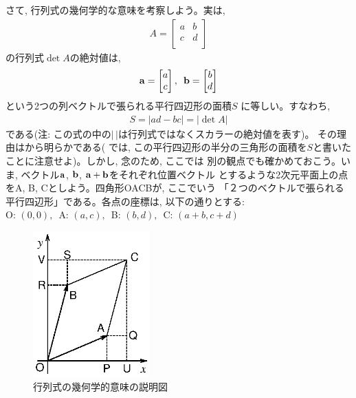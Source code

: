 さて, 行列式の幾何学的な意味を考察しよう。実は, 
\begin{eqnarray} A=\begin{bmatrix}
a & b \\
c & d \\
\end{bmatrix}\end{eqnarray}
の行列式$\det A$の絶対値は, 
\begin{eqnarray} 
\bf a=\begin{bmatrix}
a\\
c\\
\end{bmatrix},\,\,\,
\bf b=\begin{bmatrix}
b\\
d\\
\end{bmatrix}
\end{eqnarray}
という2つの列ベクトルで張られる平行四辺形の面積$S$
に等しい。すなわち, 
\begin{eqnarray}
S=|ad-bc|=|\det A|
\end{eqnarray}
である(注: この式の中の$|\,|$は行列式ではなくスカラーの絶対値を表す)。
その理由はから明らかである(
では, この平行四辺形の半分の三角形の面積を$S$と書いたことに注意せよ)。しかし, 念のため, ここでは
別の観点でも確かめておこう。いま, ベクトル${\bf a}$, ${\bf b}$, ${\bf a} + {\bf b}$をそれぞれ位置ベクトル
とするような2次元平面上の点をA, B, Cとしよう。四角形OACBが, ここでいう
「２つのベクトルで張られる平行四辺形」である。各点の座標は, 以下の通りとする:\\
O: $(0, 0),\,\,\,$A: $(a, c),\,\,\,$B: $(b, d),\,\,\,$C: $(a+b, c+d)$\\
\begin{figure}[h]
    \centering
    \includegraphics[width=4.5cm]{det2D2.eps}
    \caption{行列式の幾何学的意味の説明図\label{fig:det2D2}}
\end{figure}

